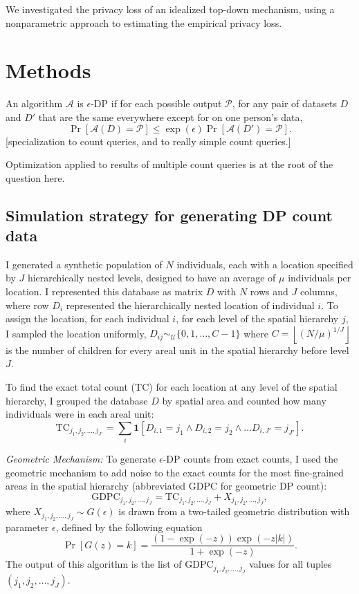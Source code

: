 \documentclass{article}
\begin{document}
We investigated the privacy loss of an idealized top-down mechanism, using a nonparametric approach to estimating the empirical privacy loss.

\section{Methods}
\label{methods}

An algorithm $\mathcal{A}$ is $\epsilon$-DP if for each possible output
$\mathcal{P}$, for any pair of datasets $D$ and $D'$ that are the same
everywhere except for on one person's data,
$$
\Pr\left[\mathcal{A}(D) = \mathcal{P}\right]
\leq \exp\left(\epsilon\right)
\Pr\left[\mathcal{A}(D') = \mathcal{P}\right].
$$
[specialization to count queries, and to really simple count queries.]

Optimization applied to results of multiple count queries is at the root of the question here.

\subsection{Simulation strategy for generating DP count data}
I generated a synthetic population of $N$ individuals, each with a location specified by $J$ hierarchically nested levels, designed to have an average of $\mu$ individuals per location.
I represented this database as matrix $D$ with $N$ rows and $J$ columns, where row $D_i$ represented the hierarchically nested location of individual $i$.
To assign the location, for each individual $i$, for each level of the spatial hierarchy $j$, I sampled the location uniformly,  $D_{ij} \sim_{\mathcal{U}} \{0, 1, \ldots, C-1\}$ where $C = \left\lfloor \left(N/\mu\right)^{1/J} \right\rfloor$ is the number of children for every areal unit in the spatial hierarchy before level $J$.

To find the exact total count (TC) for each location at any level of the spatial hierarchy, I grouped the database $D$ by spatial area and counted how many individuals were in each areal unit:
$$
\mathrm{TC}_{j_1, j_2, \ldots, j_{J'}} = \sum_i \mathbf{1}\left[
D_{i,1} = j_1 \wedge 
D_{i,2} = j_2 \wedge 
\ldots
D_{i,J'} = j_{J'}
\right].
$$

\emph{Geometric Mechanism:} To generate $\epsilon$-DP counts from exact counts, I used the geometric mechanism to add noise to the exact counts for the most fine-grained areas in the spatial hierarchy (abbreviated GDPC for geometric DP count):
$$
\mathrm{GDPC}_{j_1, j_2, \ldots, j_{J}} = \mathrm{TC}_{j_1, j_2, \ldots, j_{J}} + X_{j_1, j_2, \ldots, j_{J}},
$$
where $X_{j_1, j_2, \ldots, j_{J}} \sim G(\epsilon)$ is drawn from a two-tailed geometric distribution with parameter $\epsilon$, defined by the following equation
$$\Pr[G(z)=k] = \frac{(1 - \exp(-z))\exp(-z|k|)}{1 + \exp(-z)}.$$
The output of this algorithm is the list of $
\mathrm{GDPC}_{j_1, j_2, \ldots, j_{J}}$ values for all tuples $(j_1, j_2, \ldots, j_{J})$.
\end{document}
